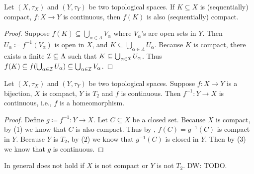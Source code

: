 \documentclass[screen]{techreport}
\numberwithin{equation}{section}
\newcommand{\diw}[1]{{\color{Red} DW: #1}}
\begin{document}
\begin{proposition}\label{Prop:ContFuncPreserveCompact}
	Let $(X,\tau_X)$ and $(Y,\tau_Y)$ be two topological spaces.
	If $K \subseteq X$ is (sequentially) compact, $f : X \to Y$ is continuous, then $f(K)$ is also (sequentially) compact.
\end{proposition}
\begin{proof}
	Suppose $f(K) \subseteq \bigcup_{\alpha \in \Lambda} V_\alpha$ where $V_\alpha$'s are open sets in $Y$.
	Then $U_\alpha \coloneqq f^{-1}(V_\alpha)$ is open in $X$, and $K \subseteq \bigcup_{\alpha \in \Lambda} U_\alpha$.
	Because $K$ is compact, there exists a finite $\mathcal{I} \subseteq \Lambda$ such that $K \subseteq \bigcup_{\alpha \in \mathcal{I}} U_\alpha$.
	Thus $f(K) \subseteq f(\bigcup_{\alpha \in \mathcal{I}} U_\alpha) \subseteq \bigcup_{\alpha \in \mathcal{I}} V_\alpha$.
\end{proof}

\begin{proposition}\label{Prop:ContBijectionFromCompactToT2IsHome}
	Let $(X,\tau_X)$ and $(Y,\tau_Y)$ be two topological spaces.
	Suppose $f : X \to Y$ is a bijection, $X$ is compact, $Y$ is $T_2$ and $f$ is continuous.
	Then $f^{-1} : Y \to X$ is continuous, i.e., $f$ is a homeomorphism.
\end{proposition}
\begin{proof}
	Define $g \coloneqq f^{-1} : Y \to X$.
	Let $C \subseteq X$ be a closed set.
	Because $X$ is compact, by (1) we know that $C$ is also compact.
	Thus by , $f(C) = g^{-1}(C)$ is compact in $Y$.
	Because $Y$ is $T_2$, by (2) we know that $g^{-1}(C)$ is closed in $Y$.
	Then by (3) we know that $g$ is continuous.
\end{proof}

\begin{example}\label{Exa:ContBijectionNotHome}
	In general  does not hold if $X$ is not compact or $Y$ is not $T_2$.
	\diw{TODO.}
\end{example}
\end{document}
